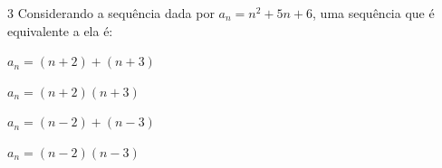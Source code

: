 

\num{3} Considerando a sequência dada por $a_{n} = n^{2} + 5n + 6$, uma
sequência que é equivalente a ela é:

\begin{escolha}
\item $a_{n} = (n + 2) + (n + 3)$
\item $a_{n} = (n + 2)(n + 3)$
\item $a_{n} = (n - 2) + (n - 3)$
\item $a_{n} = (n - 2)(n - 3)$
\end{escolha}



